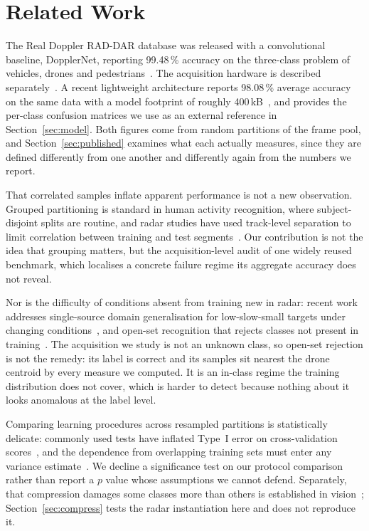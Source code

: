 \documentclass[11pt,a4paper]{article}
\begin{document}
\section{Related Work}
\label{sec:related}

The Real Doppler RAD-DAR database was released with a convolutional baseline, DopplerNet, reporting 99.48\,\% accuracy on the three-class problem of vehicles, drones and pedestrians~\cite{roldan2020}. The acquisition hardware is described separately~\cite{quevedo2019}. A recent lightweight architecture reports 98.08\,\% average accuracy on the same data with a model footprint of roughly 400\,kB~\cite{zhang2025}, and provides the per-class confusion matrices we use as an external reference in Section~\ref{sec:model}. Both figures come from random partitions of the frame pool, and Section~\ref{sec:published} examines what each actually measures, since they are defined differently from one another and differently again from the numbers we report.

That correlated samples inflate apparent performance is not a new observation. Grouped partitioning is standard in human activity recognition, where subject-disjoint splits are routine, and radar studies have used track-level separation to limit correlation between training and test segments~\cite{buchman2022}. Our contribution is not the idea that grouping matters, but the acquisition-level audit of one widely reused benchmark, which localises a concrete failure regime its aggregate accuracy does not reveal.

Nor is the difficulty of conditions absent from training new in radar: recent work addresses single-source domain generalisation for low-slow-small targets under changing conditions~\cite{chen2025}, and open-set recognition that rejects classes not present in training~\cite{bai2026}. The acquisition we study is not an unknown class, so open-set rejection is not the remedy: its label is correct and its samples sit nearest the drone centroid by every measure we computed. It is an in-class regime the training distribution does not cover, which is harder to detect because nothing about it looks anomalous at the label level.

Comparing learning procedures across resampled partitions is statistically delicate: commonly used tests have inflated Type~I error on cross-validation scores~\cite{dietterich1998}, and the dependence from overlapping training sets must enter any variance estimate~\cite{nadeau2003}. We decline a significance test on our protocol comparison rather than report a $p$ value whose assumptions we cannot defend. Separately, that compression damages some classes more than others is established in vision~\cite{hooker2019,hooker2020,tran2022}; Section~\ref{sec:compress} tests the radar instantiation here and does not reproduce it.
\end{document}
